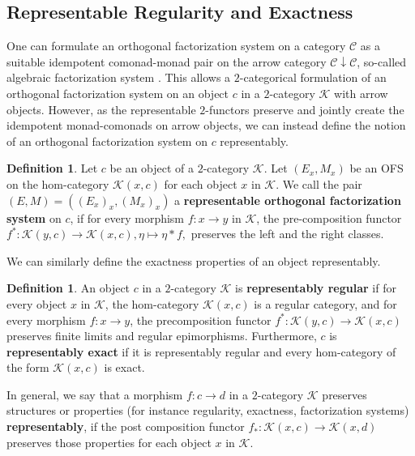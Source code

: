 \documentclass[11pt]{article}
\theoremstyle{plain}
\theoremstyle{definition}
\newtheorem{definition}[theorem]{Definition}
\numberwithin{equation}{section}
\newcommand{\C}{\mathcal{C}}
\newcommand{\K}{\mathcal{K}}
\begin{document}
\subsection{Representable Regularity and Exactness}

One can formulate an orthogonal factorization system on a category $\C$ as a suitable idempotent comonad-monad pair on the arrow category $\C\downarrow\C$, so-called algebraic factorization system \cite{GrandisTholen2006NaturalWFS}. This allows a $2$-categorical formulation of an orthogonal factorization system on an object $c$ in a $2$-category $\K$ with arrow objects. However, as the representable $2$-functors preserve and jointly create the idempotent monad-comonads on arrow objects, we can instead define the notion of an orthogonal factorization system on $c$ representably.

\begin{definition}\label{def:representable_ofs}
   Let $c$ be an object of a $2$-category $\K$. Let $(E_x,M_x)$ be an OFS on the hom-category $\K(x,c)$ for each object $x$ in $\K$. We call the pair $(E,M) = ((E_x)_x,(M_x)_x)$ a \textbf{representable orthogonal factorization system} on $c$, if for every morphism $f\colon x\to y$ in $\K$, the pre-composition functor $f^* \colon \K(y,c) \to \K(x,c), \eta\mapsto \eta*f,$ preserves the left and the right classes.
\end{definition}
We can similarly define the exactness properties of an object representably.

\begin{definition}\label{def:representable_exactness}
   An object $c$ in a $2$-category $\K$ is \textbf{representably regular} if for every object $x$ in $\K$, the hom-category $\K(x, c)$ is a regular category, and for every morphism $f \colon x \to y$, the precomposition functor $f^* \colon \K(y,c) \to\K(x, c)$ preserves finite limits and regular epimorphisms. Furthermore, $c$ is \textbf{representably exact} if it is representably regular and every hom-category of the form $\K(x, c)$ is exact.
\end{definition}
In general, we say that a morphism $f\colon c\to d$ in a $2$-category $\K$ preserves structures or properties (for instance regularity, exactness, factorization systems) \textbf{representably}, if the post composition functor $f_*\colon \K(x,c)\to \K(x,d)$ preserves those properties for each object $x$ in $\K$.
\end{document}

